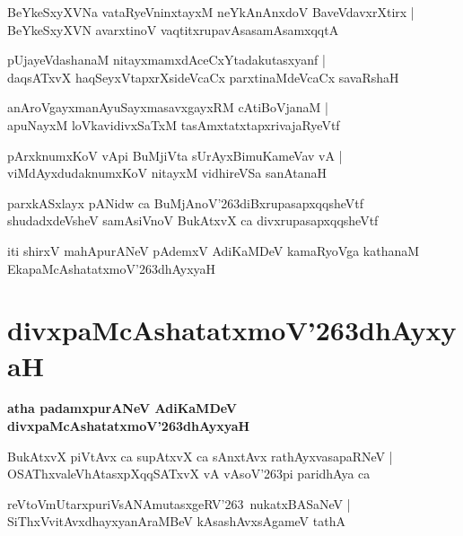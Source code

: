 \documentclass[twoside,12pt,openright]{book}
\def\S{\char'263}
\newcounter{shloka}[chapter]
\begin{document}
\begin{shloka}
BeYkeSxyXVNa vataRyeVninxtayxM neYkAnAnxdoV BaveVdavxrXtirx |\\
BeYkeSxyXVN avarxtinoV vaqtitxrupavAsasamAsamxqqtA 
\end{shloka}

\begin{shloka}
pUjayeVdashanaM nitayxmamxdAceCxYtadakutasxyanf |\\
daqsATxvX haqSeyxVtapxrXsideVcaCx parxtinaMdeVcaCx savaRshaH 
\end{shloka}

\begin{shloka}
anAroVgayxmanAyuSayxmasavxgayxRM cAtiBoVjanaM |\\
apuNayxM loVkavidivxSaTxM tasAmxtatxtapxrivajaRyeVtf 
\end{shloka}

\begin{shloka}
pArxknumxKoV vApi BuMjiVta sUrAyxBimuKameVav vA |\\
viMdAyxdudaknumxKoV nitayxM vidhireVSa sanAtanaH 
\end{shloka}

\begin{shloka}
parxkASxlayx pANidw ca BuMjAnoV\S diBxrupasapxqqsheVtf \\
shudadxdeVsheV samAsiVnoV BukAtxvX ca divxrupasapxqqsheVtf 
\end{shloka}

\begin{center}
iti shirxV mahApurANeV pAdemxV AdiKaMDeV kamaRyoVga kathanaM EkapaMcAshatatxmoV\S dhAyxyaH
\end{center}

\chapter{divxpaMcAshatatxmoV\S dhAyxyaH}

\begin{center}
{\LARGE\bfseries atha padamxpurANeV AdiKaMDeV divxpaMcAshatatxmoV\S dhAyxyaH}
\end{center}

\begin{shloka}
BukAtxvX piVtAvx ca supAtxvX ca sAnxtAvx rathAyxvasapaRNeV |\\
OSAThxvaleVhAtasxpXqqSATxvX vA vAsoV\S pi paridhAya ca 
\end{shloka}

\begin{shloka}
reVtoVmUtarxpuriVsANAmutasxgeRV\S ~nukatxBASaNeV |\\
SiThxVvitAvxdhayxyanAraMBeV kAsashAvxsAgameV tathA 
\end{shloka}
\end{document}
